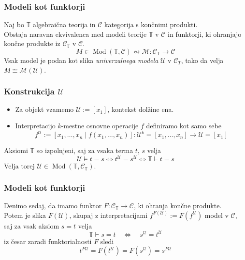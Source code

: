 \documentclass{beamer}
\DeclareMathOperator{\Mod}{Mod}
\begin{document}
\begin{frame}
\frametitle{Modeli kot funktorji}
Naj bo $\mathbb{T}$ algebraična teorija in $\mathcal{C}$ kategorija s končnimi produkti.\\
Obstaja naravna ekvivalenca med modeli teorije $\mathbb{T}$ v $\mathcal{C}$ in funktorji, ki ohranjajo končne produkte iz $\mathcal{C}_\mathbb{T}$ v $\mathcal{C}$.
$$M \in \Mod(\mathbb{T}, \mathcal{C}) \leftrightsquigarrow \mathcal{M} : \mathcal{C}_\mathbb{T} \to \mathcal{C}$$
\pause
Vsak model je podan kot slika \emph{univerzalnega modela} $\mathcal{U}$ v $\mathcal{C}_T$, tako da velja $M \cong \mathcal{M}(\mathcal{U})$.
\end{frame}

\begin{frame}
\frametitle{Konstrukcija $\mathcal{U}$}
\begin{itemize}
\item Za objekt vzamemo $\mathcal{U} := [x_1]$, kontekst dolžine ena.
\pause
\item Interpretacijo $k$-mestne osnovne operacije $f$ definiramo kot samo sebe
$$f^\mathcal{U} := [x_1, \ldots, x_n \mid f(x_1, \ldots, x_n)] : \mathcal{U}^k = [x_1, \ldots, x_n] \to \mathcal{U} = [x_1]$$
\end{itemize}
\pause
Aksiomi $\mathbb{T}$ so izpolnjeni, saj za vsaka terma $t$, $s$ velja
$$\mathcal{U} \models t = s \Longleftrightarrow t^\mathcal{U} = s^\mathcal{U} \Longleftrightarrow \mathbb{T} \vdash t = s$$
Velja torej $\mathcal{U} \in \Mod(\mathbb{T}, \mathcal{C}_\mathbb{T})$.
\end{frame}

\begin{frame}
\frametitle{Modeli kot funktorji}
Denimo sedaj, da imamo funktor $F : \mathcal{C}_\mathbb{T} \to \mathcal{C}$, ki ohranja končne produkte. \\
Potem je slika $F(\mathcal{U})$, skupaj z interpretacijami $f^{F(\mathcal{U})} := F(f^\mathcal{U})$ model v $\mathcal{C}$, saj za vsak aksiom $s = t$ velja
$$\mathbb{T} \vdash s = t \quad \Longleftrightarrow \quad s^\mathcal{U} = t^\mathcal{U}$$
\pause
iz česar zaradi funktorialnosti $F$ sledi
$$t^{F\mathcal{U}} = F(t^\mathcal{U}) = F(s^\mathcal{U}) = s^{F\mathcal{U}}$$
\end{frame}
\end{document}
